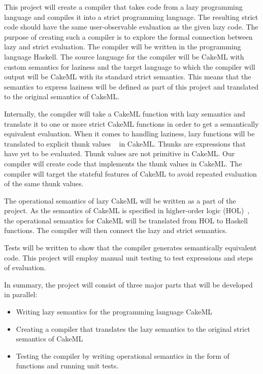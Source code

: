 This project will create a compiler that takes code from a lazy programming
language and compiles it into a strict programming language. The resulting
strict code should have the same user-observable evaluation as the given lazy
code. The purpose of creating such a compiler is to explore the formal
connection between lazy and strict evaluation. The compiler will be written in
the programming language Haskell. The source language for the compiler will be
CakeML with custom semantics for laziness and the target language to which
the compiler will output will be CakeML with its standard strict semantics. This
means that the semantics to express laziness will be defined as part of this
project and translated to the original semantics of CakeML.

Internally, the compiler will take a
CakeML function with lazy semantics and translate it to one
or more strict CakeML functions in order to get a semantically equivalent
evaluation. When it comes to handling laziness, lazy functions will be
translated to explicit thunk values ~\cite{Ingerman:1961:TWC:366062.366084} in
CakeML. Thunks are expressions that have yet to be evaluated. Thunk values are
not primitive in CakeML. Our compiler will create code that
implements the thunk values in CakeML. The compiler will target the stateful
features of CakeML to avoid repeated evaluation of the same thunk values.

The operational semantics of lazy CakeML will be written as a part of the
project. As the semantics of CakeML is specified in higher-order logic
(HOL)~\cite{HOLInter57:online},
the operational semantics for CakeML will be translated from HOL to Haskell
functions. The compiler will then connect the lazy and strict semantics.

Tests will be written to show that the compiler generates semantically
equivalent code. This project will employ manual unit testing to test
expressions and steps of evaluation.

In summary, the project will consist of three major parts that will be developed
in parallel:
\begin{itemize}
 \item Writing lazy semantics for the programming language CakeML
 \item Creating a compiler that translates the lazy semantics to the original strict semantics of CakeML
 \item Testing the compiler by writing operational semantics in the form of functions and running unit tests.
\end{itemize}
